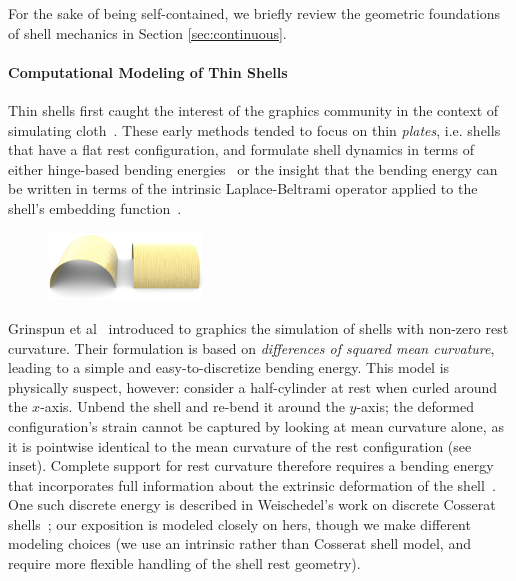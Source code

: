 \documentclass[timestamp,acmtog]{acmart}
\begin{document}
For the sake of being self-contained, we briefly review the geometric foundations of shell mechanics in Section \ref{sec:continuous}.

\paragraph{Computational Modeling of Thin Shells} 
Thin shells first caught the interest of the graphics community in the context of simulating cloth~\cite{Baraff1998,Bridson2002}. These early methods tended to focus on thin \emph{plates}, i.e. shells that have a flat rest configuration, and formulate shell dynamics in terms of either hinge-based bending energies~\cite{Sullivan2008,Tamstorf2013} or the insight that the bending energy can be written in terms of the intrinsic Laplace-Beltrami operator applied to the shell's embedding function~\cite{Bobenko2005,Bergou2006,Wardetzky2007}. 

\begin{figure}
\centering
\includegraphics[width=1.6in]{cyls.png}
\label{fig:cyls}
\end{figure}
Grinspun et al~ introduced to graphics the simulation of shells with non-zero rest curvature. Their formulation is based on \emph{differences of squared mean curvature}, leading to a simple and easy-to-discretize bending energy. This model is physically suspect, however: consider a half-cylinder at rest when curled around the $x$-axis. Unbend the shell and re-bend it around the $y$-axis; the deformed configuration's strain cannot be captured by looking at mean curvature alone, as it is pointwise identical to the mean curvature of the rest configuration (see inset). Complete support for rest curvature therefore requires a bending energy that incorporates full information about the extrinsic deformation of the shell~\cite{Grinspun2006}. One such discrete energy is described in Weischedel's work on discrete Cosserat shells~; our exposition is modeled closely on hers, though we make different modeling choices (we use an intrinsic rather than Cosserat shell model, and require more flexible handling of the shell rest geometry).
\end{document}
